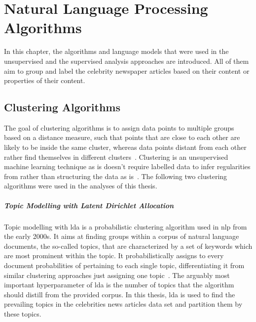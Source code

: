 \renewcommand{\imagepath}{../30-algorithms/img}

\chapter{Natural Language Processing Algorithms}\label{ch:algorithms}
In this chapter, the algorithms and language models that were used in the unsupervised and the supervised analysis approaches are introduced. All of them aim to group and label the celebrity newspaper articles based on their content or properties of their content.



\section{Clustering Algorithms}\label{ch:clustering_algorithms}
The goal of clustering algorithms is to assign data points to multiple groups based on a distance measure, such that points that are close to each other are likely to be inside the same cluster, whereas data points distant from each other rather find themselves in different clusters~\autocite{everitt_cluster_2011,jain_algorithms_1988}. Clustering is an unsupervised machine learning technique as is doesn't require labelled data to infer regularities from rather than structuring the data as is~\autocite{xu_survey_2005}. The following two clustering algorithms were used in the analyses of this thesis.

\paragraph{Topic Modelling with Latent Dirichlet Allocation}\label{ch:lda}
Topic modelling with \gls{lda} is a probabilistic clustering algorithm used in \gls{nlp} from the early 2000s. It aims at finding groups within a corpus of natural language documents, the so-called topics, that are characterized by a set of keywords which are most prominent within the topic. It probabilistically assigns to every document probabilities of pertaining to each single topic, differentiating it from similar clustering approaches just assigning one topic~\autocite{blei_latent_2003, blei_probabilistic_2012}. The arguably most important hyperparameter of \gls{lda} is the number of topics that the algorithm should distill from the provided corpus. In this thesis, \gls{lda} is used to find the prevailing topics in the celebrities news articles data set and partition them by these topics.

